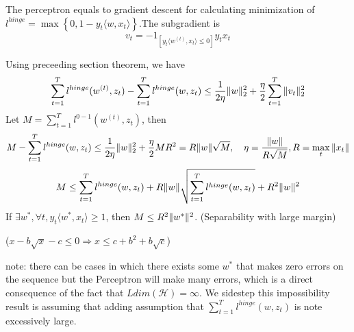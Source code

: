 The perceptron equals to gradient descent for calculating minimization of $ l^{hinge} = \max\left\{ 0, 1 - y_t \langle w, x_t \rangle \right\}$.The subgradient is 
\[
    v_t  = -1_{[y_t \langle w^{(t)}, x_t \rangle \le 0]} y_t x_t
\]

Using preceeding section theorem, we have
\[
    \sum^{T}_{t=1} l^{hinge}(w^{(t)}, z_t) - \sum^{T}_{t=1} l^{hinge}(w, z_t) \le \frac{1}{2\eta} \Arrowvert w \Arrowvert^2_2 + \frac{\eta}{2} \sum^{T}_{t=1} \Arrowvert v_t \Arrowvert^2_2
\]
Let $ M = \sum^{T}_{t=1} l^{0-1}(w^{(t)}, z_t) $, then
\[
    M - \sum^{T}_{t=1} l^{hinge}(w, z_t) \le \frac{1}{2\eta} \Arrowvert w \Arrowvert^2_2 + \frac{\eta}{2} M R^2 = R \Arrowvert w \Arrowvert \sqrt{M}, \quad \eta = \frac{ \Arrowvert w \Arrowvert}{R \sqrt{M}}, R = \max_{t} \Arrowvert x_t \Arrowvert
\]
\[
    M \le \sum^{T}_{t=1} l^{hinge}(w,z_t) + R \Arrowvert w \Arrowvert \sqrt{ \sum^{T}_{t=1} l^{hinge}(w, z_t)} + R^2 \Arrowvert w \Arrowvert^2
\]
If $ \exists w^*, \forall t, y_t \langle w^*, x_t \rangle \ge 1 $, then $ M \le R^2 \Arrowvert w^* \Arrowvert^2 $. (Separability with large margin)

($ x - b\sqrt x - c \le 0 \Rightarrow x \le c + b^2 + b \sqrt c $)

note: there can be cases in which there exists some $ w^* $ that makes zero errors on the sequence but the Perceptron will make many errors, which is a direct consequence of the fact that $ Ldim(\mathcal{H}) = \infty $. We sidestep this impossibility result is assuming that adding assumption that $ \sum^{T}_{t=1} l^{hinge}(w,z_t) $ is note excessively large.


